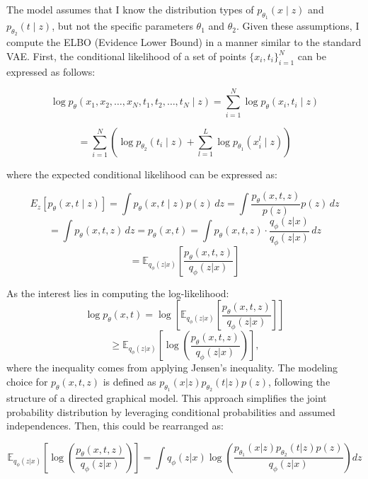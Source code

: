 \documentclass{article}
\begin{document}
The model assumes that I know the distribution types of \( p_{\theta_1} (x \mid z) \) and \( p_{\theta_2} (t \mid z) \), but not the specific parameters \( \theta_1 \) and \( \theta_2 \). Given these assumptions, 
I compute the ELBO (Evidence Lower Bound) in a manner similar to the standard VAE. First, the conditional likelihood of a set of points \(\{x_i, t_i\}_{i=1}^N\) can be expressed as follows:


\[
\log p_{\theta}(x_1, x_2, \ldots, x_N , t_1, t_2, \ldots, t_N \mid z) = \sum_{i=1}^N \log p_{\theta}(x_i, t_i \mid z)
\]

\begin{equation}
= \sum_{i=1}^N \left(\log p_{\theta_2}(t_i \mid z) + \sum_{l=1}^L \log p_{\theta_1}(x_i^l \mid z)\right) 
\end{equation}

where the expected conditional likelihood can be expressed as:

\[
E_z \left[ p_\theta (x, t \mid z) \right] = \int p_\theta (x, t \mid z) p(z) \, dz = \int \frac{p_\theta(x,t,z)}{p(z)} p(z) \, dz
\]
\begin{equation}
=\int p_\theta(x,t,z) \, dz = p_\theta(x,t) = \int p_\theta(x,t,z) \cdot \frac{q_\phi(z|x)}{q_\phi(z|x)} \, dz 
\end{equation}
\[
= \mathbb{E}_{q_\phi(z|x)} \left[ \frac{p_\theta(x,t,z)}{q_\phi(z|x)} \right]
\]

As the interest lies in computing the log-likelihood:
\begin{equation}
\log p_\theta(x, t) = \log \left[ \mathbb{E}_{q_\phi(z|x)} \left[ \frac{p_\theta(x,t,z)}{q_\phi(z|x)} \right] \right]
\end{equation}
\[
 \geq \mathbb{E}_{q_\phi(z|x)} \left[ \log \left( \frac{p_\theta(x,t,z)}{q_\phi(z|x)} \right) \right],
\]
where the inequality comes from applying Jensen’s inequality.
The modeling choice for \( p_\theta(x, t, z) \) is defined as \( p_{\theta_1}(x|z) p_{\theta_2}(t|z) p(z) \), following the structure of a directed graphical model. This approach simplifies the joint probability distribution by leveraging conditional probabilities and assumed independences. Then, this could be rearranged as:

\[
\mathbb{E}_{q_\phi(z|x)} \left[ \log \left( \frac{p_\theta(x, t, z)}{q_\phi(z|x)} \right) \right] = \int q_\phi(z|x) \log \left( \frac{p_{\theta_1}(x|z) p_{\theta_2}(t|z) p(z)}{q_\phi(z|x)} \right) dz
\]
\end{document}
